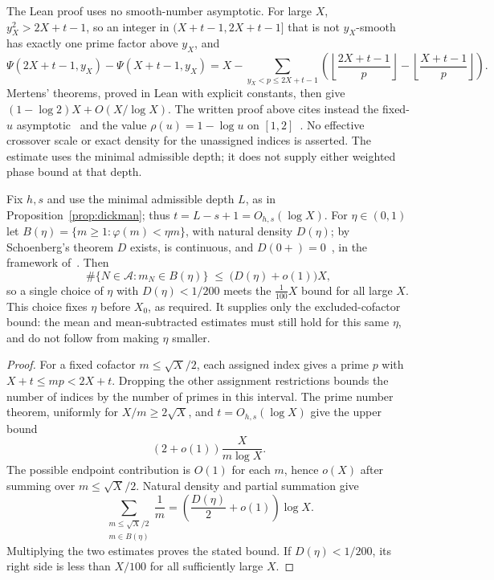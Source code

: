 \noindent
The Lean proof uses no smooth-number asymptotic. For large $X$,
$y_X^2>2X+t-1$, so an integer in $(X+t-1,2X+t-1]$ that is not
$y_X$-smooth has exactly one prime factor above $y_X$, and
\[
 \Psi(2X+t-1,y_X)-\Psi(X+t-1,y_X)
 =X-\sum_{y_X<p\le2X+t-1}
 \left(\left\lfloor\frac{2X+t-1}{p}\right\rfloor
      -\left\lfloor\frac{X+t-1}{p}\right\rfloor\right).
\]
Mertens' theorems, proved in Lean with explicit constants,
then give $(1-\log2)X+O(X/\log X)$. The written proof above
cites instead the fixed-$u$
asymptotic~\cite[(1.1), p.~268]{granville-smooth} and the value
$\rho(u)=1-\log u$ on $[1,2]$~\cite[(1.3), p.~268]{granville-smooth}.
No effective crossover scale or exact density for the unassigned indices
is asserted. The estimate uses the minimal admissible depth; it does not
supply either weighted phase bound at that depth.

\begin{prop}\label{prop:badcof}
Fix $h,s$ and use the minimal admissible depth $L$, as in
Proposition~\ref{prop:dickman}; thus $t=L-s+1=O_{h,s}(\log X)$.
For $\eta\in(0,1)$ let $B(\eta)=\{m\ge1:\varphi(m)<\eta m\}$, with natural density
$D(\eta)$; by Schoenberg's theorem $D$ exists, is continuous, and
$D(0+)=0$~\cite[\S17, p.~193]{schoenberg1928}, in the framework
of~\cite[Theorem~1, pp.~318--319, and \S8, p.~323]{schoenberg1936}. Then
\[
  \#\{N\in\mathcal A:m_N\in B(\eta)\}
  \;\le\;\bigl(D(\eta)+o(1)\bigr)X ,
\]
so a single choice of $\eta$ with $D(\eta)<1/200$ meets the $\tfrac{1}{100}X$
bound for all large $X$. This choice fixes $\eta$ before $X_0$, as
required. It supplies only the excluded-cofactor bound: the mean and
mean-subtracted estimates must still hold for this same $\eta$, and do
not follow from making $\eta$ smaller.
\end{prop}

\begin{proof}
For a fixed cofactor $m\le\sqrt X/2$, each assigned index gives a prime
$p$ with $X+t\le mp<2X+t$. Dropping the other assignment restrictions
bounds the number of indices by the number of primes in this interval.
The prime number theorem, uniformly for $X/m\ge2\sqrt X$, and
$t=O_{h,s}(\log X)$ give the upper bound
\[
 (2+o(1))\frac{X}{m\log X}.
\]
The possible endpoint contribution is $O(1)$ for each $m$, hence $o(X)$
after summing over $m\le\sqrt X/2$. Natural density and partial summation
give
\[
 \sum_{\substack{m\le\sqrt X/2\\m\in B(\eta)}}\frac1m
       =\left(\frac{D(\eta)}2+o(1)\right)\log X.
\]
Multiplying the two estimates proves the stated bound. If
$D(\eta)<1/200$, its right side is less than $X/100$ for all sufficiently
large $X$.
\end{proof}

